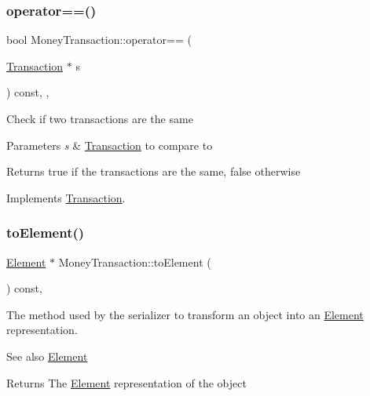 \subsubsection{\texorpdfstring{operator==()}{operator==()}}
{\footnotesize\ttfamily bool Money\+Transaction\+::operator== (\begin{DoxyParamCaption}\item[{\mbox{\hyperlink{classTransaction}{Transaction}} $\ast$}]{s }\end{DoxyParamCaption}) const\hspace{0.3cm}{\ttfamily [inline]}, {\ttfamily [override]}, {\ttfamily [virtual]}}

Check if two transactions are the same


\begin{DoxyParams}{Parameters}
{\em s} & \mbox{\hyperlink{classTransaction}{Transaction}} to compare to \\
\hline
\end{DoxyParams}
\begin{DoxyReturn}{Returns}
true if the transactions are the same, false otherwise 
\end{DoxyReturn}


Implements \mbox{\hyperlink{classTransaction_a9a17c97fdcda6791484ad6d07b34470e}{Transaction}}.

\mbox{\label{classMoneyTransaction_a84adc847266467965014cb04acd48bea}} 
\subsubsection{\texorpdfstring{to\+Element()}{toElement()}}
{\footnotesize\ttfamily \mbox{\hyperlink{classElement}{Element}} $\ast$ Money\+Transaction\+::to\+Element (\begin{DoxyParamCaption}{ }\end{DoxyParamCaption}) const\hspace{0.3cm}{\ttfamily [override]}, {\ttfamily [virtual]}}

The method used by the serializer to transform an object into an \mbox{\hyperlink{classElement}{Element}} representation. \begin{DoxySeeAlso}{See also}
\mbox{\hyperlink{classElement}{Element}}
\end{DoxySeeAlso}
\begin{DoxyReturn}{Returns}
The \mbox{\hyperlink{classElement}{Element}} representation of the object 
\end{DoxyReturn}


